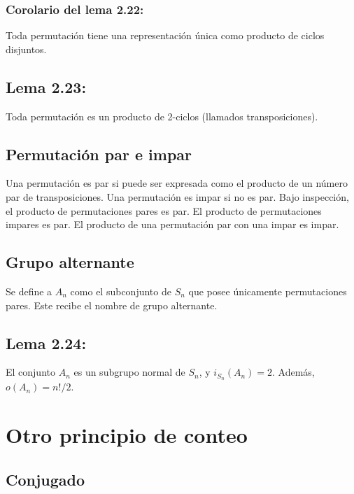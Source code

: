 \documentclass{article}
\begin{document}
\subsubsection*{\color{blue} Corolario del lema 2.22:}

Toda permutación tiene una representación única como producto de ciclos disjuntos.

\subsection*{\color{blue} Lema 2.23:}

Toda permutación es un producto de 2-ciclos (llamados transposiciones).

\subsection*{\color{violet} Permutación par e impar}

Una permutación es par si puede ser expresada como el producto de un número par de transposiciones. Una permutación es impar si no es par. Bajo inspección, el producto de permutaciones pares es par. El producto de permutaciones impares es par. El producto de una permutación par con una impar es impar.

\subsection*{\color{violet} Grupo alternante}

Se define a $A_n$ como el subconjunto de $S_n$ que posee únicamente permutaciones pares. Este recibe el nombre de grupo alternante.

\subsection*{\color{blue} Lema 2.24:}

El conjunto $A_n$ es un subgrupo normal de $S_n$, y $i_{S_n}(A_n)=2$. Además, $o(A_n)=n!/2$.

\newpage
\section{Otro principio de conteo}

\subsection*{\color{violet} Conjugado}
\end{document}
